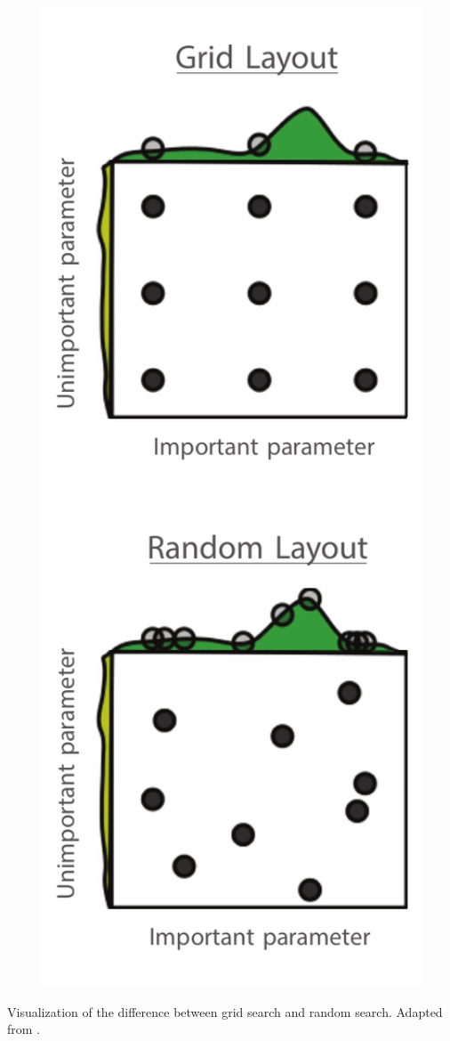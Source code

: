 \begin{marginfigure}
  \centerfloat
  \includegraphics[width=1\textwidth]{figures/randomsearch/random.pdf}
  \caption[Random Search]{Visualization of the difference between grid search and random search. Adapted from \citet{bergstraRandomSearchHyperparameter2012}.}
  \label{fig:ml:random_search}
\end{marginfigure}

